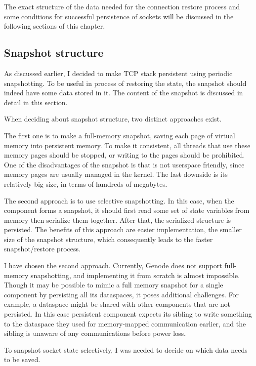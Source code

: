 The exact structure of the data needed for the connection restore process and
some conditions for successful persistence of sockets will be discussed in the
following sections of this chapter.

\subsection{Snapshot structure}

As discussed earlier, I decided to make TCP stack persistent using periodic
snapshotting.  To be useful in process of restoring the state, the snapshot
should indeed have some data stored in it. The content of the snapshot is
discussed in detail in this section.

When deciding about snapshot structure, two distinct approaches exist.

The first one is to make a full-memory snapshot, saving each page of virtual
memory into persistent memory. To make it consistent, all threads that use
these memory pages should be stopped, or writing to the pages should be
prohibited.  One of the disadvantages of the snapshot is that is not userspace
friendly, since memory pages are usually managed in the kernel. The last
downside is its relatively big size, in terms of hundreds of megabytes. 

The second approach is to use selective snapshotting. In this case, when the
component forms a snapshot, it should first read some set of state variables
from memory then serialize them together. After that, the serialized structure
is persisted. The benefits of this approach are easier implementation, the
smaller size of the snapshot structure, which consequently leads to the faster
snapshot/restore process.

I have chosen the second approach. Currently, Genode does not support
full-memory snapshotting, and implementing it from scratch is almost
impossible. Though it may be possible to mimic a full memory snapshot for a
single component by persisting all its dataspaces, it poses additional
challenges. For example, a dataspace might be shared with other components that
are not persisted. In this case persistent component expects its sibling to
write something to the dataspace they used for memory-mapped communication
earlier, and the sibling is unaware of any communications before power loss.

To snapshot socket state selectively, I was needed to decide on which data needs
to be saved. 

